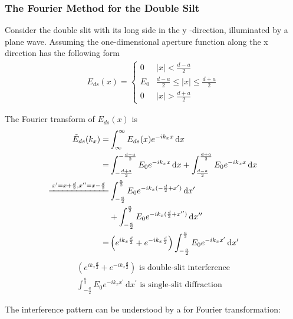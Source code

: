 \subsubsection{The Fourier Method for the Double Silt}

Consider the double slit with its long side in the y -direction, illuminated by a plane wave. Assuming the one-dimensional aperture function along the x direction has the following form
\begin{align*}
    E_{ds}(x)=\left\{\begin{array}{cc}
        0   & |x|<\frac{d-a}{2}\\
        E_0 & \frac{d-a}{2}\le |x| \le \frac{d+a}{2} \\
        0   & |x|>\frac{d+a}{2}
    \end{array}\right.
\end{align*}

The Fourier transform of $E_{ds}(x)$ is 
\begin{align*}
    \tilde{E}_{ds}(k_x)=&\int_{\infty}^{\infty}E_{ds}(x)e^{-ik_x x}\,\mathrm{d}x\\
    =&\int_{-\frac{d+a}{2}}^{-\frac{d-a}{2}} E_0 e^{-ik_x x}\,\mathrm{d} x + \int_{\frac{d-a}{2}}^{\frac{d+a}{2}} E_0 e^{-ik_x x}\,\mathrm{d} x\\
    \xlongequal{x^{\prime}=x+\frac{d}{2}, x^{\prime\prime}=x-\frac{d}{2}}&\int_{-\frac{a}{2}}^{\frac{a}{2}} E_0 e^{-ik_x (-\frac{d}{2}+x^{\prime})}\,\mathrm{d}x^{\prime} \\
    &+ \int_{-\frac{a}{2}}^{\frac{a}{2}} E_0 e^{-ik_x (\frac{d}{2}+x^{\prime\prime})}\,\mathrm{d}x^{\prime\prime}\\
    =&\left( e^{ik_x \frac{d}{2}} + e^{-ik_x \frac{d}{2}}\right)\int_{-\frac{a}{2}}^{\frac{a}{2}} E_0 e^{-ik_x x^{\prime}}\,\mathrm{d} x^{\prime}
\end{align*}
\begin{align*}
    \left( e^{ik_x \frac{d}{2}} + e^{-ik_x \frac{d}{2}}\right) \text{ is double-slit interference}\\
    \int_{-\frac{a}{2}}^{\frac{a}{2}} E_0 e^{-ik_x x^{\prime}}\,\mathrm{d} x^{\prime} \text{ is single-slit diffraction}
\end{align*}

The interference pattern can be understood by a  for Fourier transformation: 

